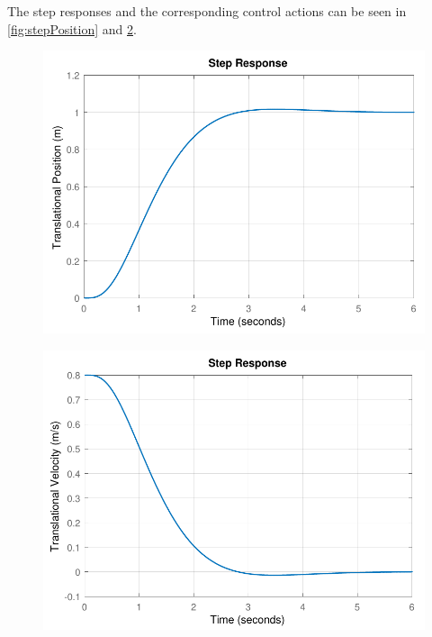 The step responses and the corresponding control actions can be seen in \autoref{fig:stepPosition} and \ref{fig:stepPositionControlAction}.

\begin{minipage}{\linewidth}
    \begin{minipage}{0.5\linewidth}
        \begin{figure}[H]
            \includegraphics[scale=.55]{figures/stepPosition}
            \centering
            \label{fig:stepPosition}
        \end{figure}
    \end{minipage}
    \hspace{0.03\linewidth}
    \begin{minipage}{0.5\linewidth}
        \begin{figure}[H] 
            \includegraphics[scale=.55]{figures/stepPositionControlAction}
            \centering
            \label{fig:stepPositionControlAction}
        \end{figure}
    \end{minipage}
\end{minipage}
%


